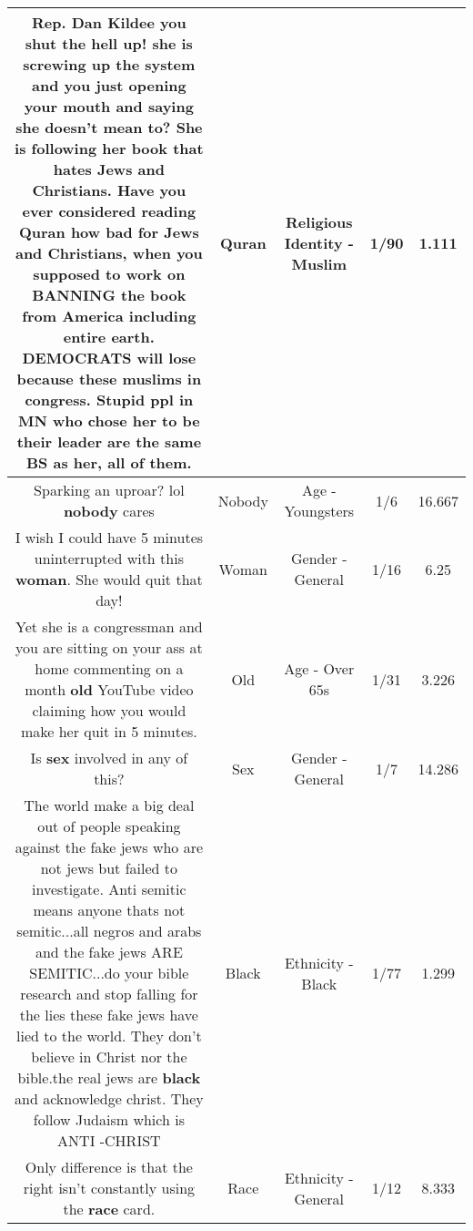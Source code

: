 \documentclass[11pt]{article}
\newlength\mylength
\begin{document}
\begin{center}
\begin{longtable}{|C{.65\mylength}|C{.30\mylength}|C{.12\mylength}|C{.12\mylength}|C{.12\mylength}|}
  \small Rep. Dan Kildee you shut the hell up! she is screwing up the system and you just opening your mouth and saying she doesn't mean to?  She is following her book that hates Jews and Christians. Have you ever considered reading \textbf{Quran} how bad for Jews and Christians, when you supposed to work on BANNING the book from America including entire earth. DEMOCRATS will lose because these muslims in congress.  Stupid ppl in MN who chose her to be their leader are the same BS as her, all of them.\normalsize   & Quran & Religious Identity - Muslim & 1/90 & 1.111 \\  \hline
  \small Sparking an uproar? lol \textbf{nobody} cares\normalsize   & Nobody & Age - Youngsters & 1/6 & 16.667 \\  \hline
  \small I wish I could have 5 minutes uninterrupted with this \textbf{woman}. She would quit that day!\normalsize   & Woman & Gender - General & 1/16 & 6.25 \\  \hline
  \small Yet she is a congressman and you are sitting on your ass at home commenting on a month \textbf{old} YouTube video claiming how you would make her quit in 5 minutes.\normalsize   & Old & Age - Over 65s & 1/31 & 3.226 \\  \hline
  \small Is \textbf{sex} involved in any of this?\normalsize   & Sex & Gender - General & 1/7 & 14.286 \\  \hline
  \small The world make a big deal out of people speaking against the fake jews who are not jews but failed to investigate. Anti semitic means anyone thats not semitic...all negros and arabs and the fake jews ARE SEMITIC...do your bible research and stop falling for the lies these fake jews have lied to the world. They don't believe in Christ nor the bible.the real jews are \textbf{black} and acknowledge christ. They follow Judaism which is ANTI -CHRIST\normalsize   & Black & Ethnicity - Black & 1/77 & 1.299 \\  \hline
  \small Only difference is that the right isn't constantly using the \textbf{race} card.\normalsize   & Race & Ethnicity - General & 1/12 & 8.333 \\  \hline

\end{longtable}
\end{center}
\end{document}
